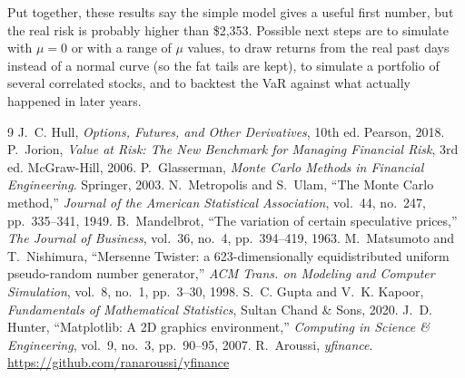 \documentclass[10pt,a4paper,openany,oneside]{book}
\begin{document}
Put together, these results say the simple model gives a useful first number, but the real risk
is probably higher than \$2{,}353. Possible next steps are to simulate with $\mu = 0$ or with a
range of $\mu$ values, to draw returns from the real past days instead of a normal curve (so the
fat tails are kept), to simulate a portfolio of several correlated stocks, and to backtest the
VaR against what actually happened in later years.

\begingroup
\renewcommand{\chapter}[2]{\section*{References}\addcontentsline{toc}{chapter}{References}}
\begin{thebibliography}{9}
\small
{} J.~C. Hull, \emph{Options, Futures, and Other Derivatives}, 10th ed. Pearson, 2018.
 P.~Jorion, \emph{Value at Risk: The New Benchmark for Managing Financial Risk},
  3rd ed. McGraw-Hill, 2006.
 P.~Glasserman, \emph{Monte Carlo Methods in Financial Engineering}.
  Springer, 2003.
 N.~Metropolis and S.~Ulam, ``The Monte Carlo method,'' \emph{Journal of the
  American Statistical Association}, vol.~44, no.~247, pp.~335--341, 1949.
 B.~Mandelbrot, ``The variation of certain speculative prices,'' \emph{The
  Journal of Business}, vol.~36, no.~4, pp.~394--419, 1963.
 M.~Matsumoto and T.~Nishimura, ``Mersenne Twister: a 623-dimensionally
  equidistributed uniform pseudo-random number generator,'' \emph{ACM Trans. on Modeling and
  Computer Simulation}, vol.~8, no.~1, pp.~3--30, 1998.
 S.~C. Gupta and V.~K. Kapoor, \emph{Fundamentals of Mathematical Statistics},
  Sultan Chand \& Sons, 2020.
 J.~D. Hunter, ``Matplotlib: A 2D graphics environment,'' \emph{Computing in
  Science \& Engineering}, vol.~9, no.~3, pp.~90--95, 2007.
 R.~Aroussi, \emph{yfinance}. \url{https://github.com/ranaroussi/yfinance}
\end{thebibliography}
\endgroup

\appendix
\titlespacing*{\chapter}{0pt}{-30pt}{8pt}
\end{document}
